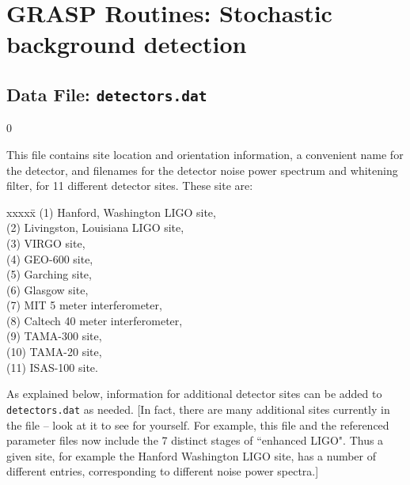 \section{GRASP Routines: Stochastic background detection}

\subsection{Data File: {\tt detectors.dat}}
\label{subsec:detectors.dat}
\setcounter{equation}0

This file contains site location and orientation information, a 
convenient name for the detector, and filenames for the detector noise 
power spectrum and whitening filter, for 11 different detector sites.
These site are:
\begin{tabbing}
xxxxx\=\kill
\>(1) Hanford, Washington LIGO site,\\ 
\>(2) Livingston, Louisiana LIGO site,\\
\>(3) VIRGO site,\\
\>(4) GEO-600 site,\\
\>(5) Garching site,\\
\>(6) Glasgow site,\\
\>(7) MIT 5 meter interferometer,\\
\>(8) Caltech 40 meter interferometer,\\
\>(9) TAMA-300 site,\\
\>(10) TAMA-20 site,\\ 
\>(11) ISAS-100 site.
\end{tabbing}
As explained below, information for additional detector sites can
be added to {\tt detectors.dat} as needed. [In fact, there are many
additional sites currently in the file -- look at it to see for yourself.
For example, this file and the referenced parameter files now include the
7 distinct stages of ``enhanced LIGO".  Thus a given site, for example
the Hanford Washington LIGO site, has a number of different entries,
corresponding to different noise power spectra.]

